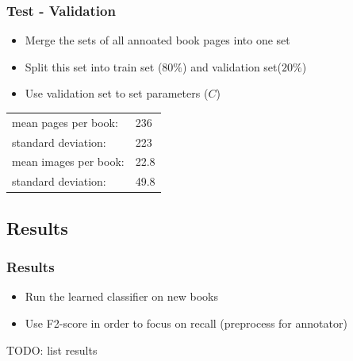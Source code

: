 \begin{frame}
\frametitle{Test - Validation}
\begin{itemize}
\item Merge the sets of all annoated book pages into one set
\item Split this set into train set ($80\%$) and validation set($20\%$)
\item Use validation set to set parameters ($C$)
\end{itemize}

\begin{center}
\begin{tabular}{l l}
mean pages per book: & 236\\
standard deviation: & 223\\
mean images per book: & 22.8\\
standard deviation: & 49.8
\end{tabular}
\end{center}


\end{frame}

\subsection{Results}
\begin{frame}
\frametitle{Results}
\begin{itemize}
\item Run the learned classifier on new books
\item Use F2-score in order to focus on recall (preprocess for annotator)
\end{itemize}
TODO: list results

\end{frame}
